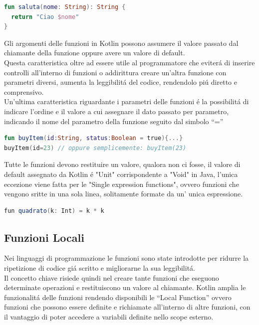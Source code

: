 \begin{lstlisting}[language=Kotlin,caption={Esempio Funzione Kotlin}]
fun saluta(nome: String): String {
  return "Ciao $nome"
}
\end{lstlisting}

Gli argomenti delle funzioni in Kotlin possono assumere il valore passato dal chiamante della funzione oppure avere un valore di default.\\ Questa caratteristica oltre ad essere utile al programmatore che eviter\'a di inserire controlli all'interno di funzioni o addirittura creare un'altra funzione con parametri diversi, aumenta la leggibilit\'a del codice, rendendolo pi\'u diretto e comprensivo.\\
Un'ultima caratteristica riguardante i parametri delle funzioni \'e la possibilit\'a di indicare l'ordine e il valore a cui assegnare il dato passato per parametro, indicando il nome del parametro della funzione seguito dal simbolo ``=''

\begin{lstlisting}[language=kotlin,caption={Esempio Kotlin Parametri}]
fun buyItem(id:String, status:Boolean = true){...}
buyItem(id=23) // oppure semplicemente: buyItem(23)
\end{lstlisting}

Tutte le funzioni devono restituire un valore, qualora non ci fosse, il valore di default assegnato da Kotlin \'e "Unit" corrispondente a "Void" in Java, l'unica eccezione viene fatta per le "Single expression functions", ovvero funzioni che vengono sritte in una sola linea, solitamente formate da un' unica espressione.
\begin{lstlisting}[language=java,caption={Esempio Single Expression Function in Kotlin}]
fun quadrato(k: Int) = k * k
\end{lstlisting}

\subsection{Funzioni Locali}
Nei linguaggi di programmazione le funzioni sono state introdotte per ridurre la ripetizione di codice gi\'a scritto e migliorarne la sua leggibilit\'a.\\
Il concetto chiave risiede quindi nel creare tante funzioni che eseguono determinate operazioni e restituiscono un valore al chiamante.
Kotlin amplia le funzionalit\'a delle funzioni rendendo disponibili le ``Local Function'' ovvero funzioni che possono essere definite e richiamate all'interno di altre funzioni, con il vantaggio di poter accedere a variabili definite nello scope esterno.

